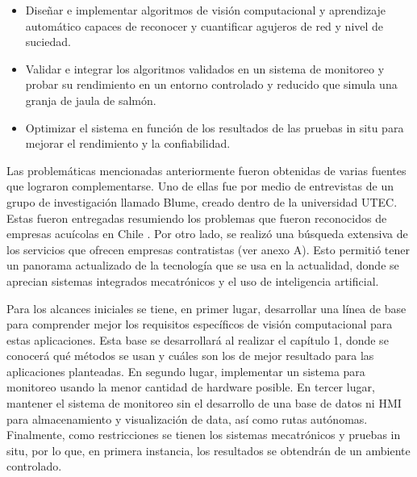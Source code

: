 \begin{itemize}
    \item Diseñar e implementar algoritmos de visión computacional y aprendizaje automático capaces de reconocer y cuantificar agujeros de red y nivel de suciedad.
    \item Validar e integrar los algoritmos validados en un sistema de monitoreo y probar su rendimiento en un entorno controlado y reducido que simula una granja de jaula de salmón.
    \item Optimizar el sistema en función de los resultados de las pruebas in situ para mejorar el rendimiento y la confiabilidad.
\end{itemize}


Las problemáticas mencionadas anteriormente fueron obtenidas de varias fuentes que lograron complementarse. Uno de ellas fue por medio de entrevistas de un grupo de investigación llamado Blume, creado dentro de la universidad UTEC. Estas fueron entregadas resumiendo los problemas que fueron reconocidos de empresas acuícolas en Chile \cite{Entrevistas_Blume}. Por otro lado, se realizó una búsqueda extensiva de los servicios que ofrecen empresas contratistas (ver anexo A). Esto permitió tener un panorama actualizado de la tecnología que se usa en la actualidad, donde se aprecian sistemas integrados mecatrónicos y el uso de inteligencia artificial.


Para los alcances iniciales se tiene, en primer lugar, desarrollar una línea de base para comprender mejor los requisitos específicos de visión computacional para estas aplicaciones. Esta base se desarrollará al realizar el capítulo 1, donde se conocerá qué métodos se usan y cuáles son los de mejor resultado para las aplicaciones planteadas. En segundo lugar, implementar un sistema para monitoreo usando la menor cantidad de hardware posible. En tercer lugar, mantener el sistema de monitoreo sin el desarrollo de una base de datos ni HMI para almacenamiento y visualización de data, así como rutas autónomas. Finalmente, como restricciones se tienen los sistemas mecatrónicos y pruebas in situ, por lo que, en primera instancia, los resultados se obtendrán de un ambiente controlado. 